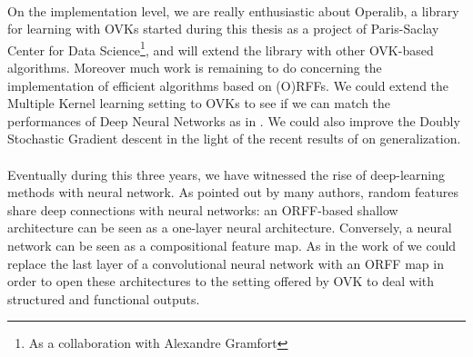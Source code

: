 \paragraph{}
On the implementation level, we are really enthusiastic about Operalib, a
library for learning with \aclp{OVK} started during this thesis as a project of
Paris-Saclay Center for Data Science\footnote{As a collaboration with
Alexandre Gramfort}, and will extend the library with other \acs{OVK}-based
algorithms. Moreover much work is remaining to do concerning the implementation
of efficient algorithms based on (O)\acsp{RFF}. We could extend the Multiple
Kernel learning setting to \acsp{OVK} to see if we can match the performances
of Deep Neural Networks as in \citet{lu2014scale}.  We could also improve the
Doubly Stochastic Gradient descent in the light of the recent results of
\citet{rudi2016generalization} on generalization.
\paragraph{}
Eventually during this three years, we have witnessed the rise of deep-learning
methods with neural network. As pointed out by many authors, random features
share deep connections with neural networks: an ORFF-based shallow architecture
can be seen as a one-layer  neural architecture. Conversely, a neural network
can be seen as
a compositional feature map. As in the work of \citet{yang2015deep} we could
replace the last layer of a convolutional neural network
\citep{lecun1995convolutional} with an \acs{ORFF} map in order to open these
architectures to the setting offered by OVK to deal with structured and
functional outputs.
